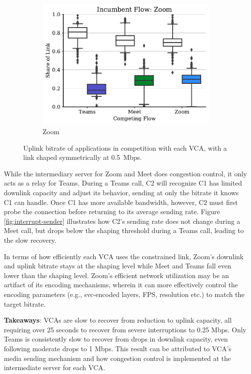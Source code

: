 \begin{figure}[t!]
\begin{subfigure}[t]{.33\textwidth}
        \includegraphics[width=1\textwidth]{figures/comp_all/box_plot_zoom_ul_0.5_all.pdf}
        \caption{Zoom}
        \label{subfig:zoom_ul_box}
    \end{subfigure}
    \caption{Uplink bitrate of applications in competition with each VCA, with a link shaped symmetrically at 0.5~Mbps.}
    \label{fig:boxplot-upld}
\end{figure}




While the intermediary server for Zoom and Meet does congestion control, it only acts as a relay for Teams. During a Teams call, C2 will recognize C1 has limited downlink capacity and adjust its behavior, sending at only the bitrate it knows C1 can handle. Once C1 has more available bandwidth, however, C2 must first probe the connection before returning to its average sending rate. Figure \ref{fig:interrupt-sender} illustrates how C2's sending rate does not change during a Meet call, but drops below the shaping threshold during a Teams call, leading to the slow recovery.


In terms of how efficiently each VCA uses the constrained link, Zoom's downlink and uplink bitrate stays at the shaping level while Meet and Teams fall even lower than the shaping level. Zoom's efficient network utilization may be an artifact of its encoding mechanisms, wherein it can more effectively control the encoding parameters (e.g., svc-encoded layers, FPS, resolution etc.) to match the target bitrate.  

\begin{mdframed}[roundcorner=5pt, backgroundcolor=black!10]
\noindent \textbf{Takeaways}: VCAs are slow to recover from reduction to uplink capacity, all requiring over 25 seconds to recover from severe interruptions to 0.25 Mbps. Only Teams is consistently slow to recover from drops in downlink capacity, even following moderate drops to 1 Mbps. This result can be attributed to VCA's media sending mechanism and how  congestion control is implemented at the intermediate server for each VCA. 
\end{mdframed}


